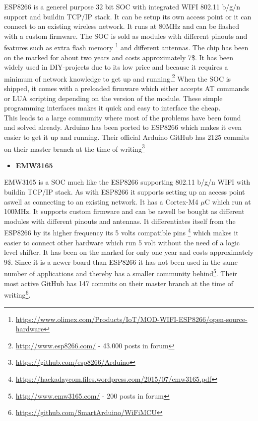 ESP8266 is a generel purpose 32 bit SOC with integrated WIFI 802.11 b/g/n support and buildin TCP/IP stack. It can be setup its own access point or it can connect to an existing wireless network.
It runs at 80MHz and can be flashed with a custom firmware. 
The SOC is sold as modules with different pinouts and features such as extra flash memory \footnote{\url{https://www.olimex.com/Products/IoT/MOD-WIFI-ESP8266/open-source-hardware}} and different antennas.
The chip has been on the marked for about two years and costs approximately 7\$. 
It has been widely used in DIY-projects due to its low price and because it requires a minimum of network knowledge to get up and running.\footnote{\url{http://www.esp8266.com/} - 43.000 posts in forum} When the SOC is shipped, it comes with a preloaded firmware which either accepts AT commands or LUA scripting depending on the version of the module. These simple programming interfaces makes it quick and easy to interface the cheap. \\
This leads to a large community where most of the problems have been found and solved already. Arduino has been ported to ESP8266 which makes it even easier to get it up and running. Their official Arduino GitHub has 2125 commits on their master branch at the time of writing\footnote{\url{https://github.com/esp8266/Arduino}} \\

\begin{itemize}
	\item \textbf{EMW3165}
\end{itemize}
EMW3165 is a SOC much like the ESP8266 supporting 802.11 b/g/n WIFI with buildin TCP/IP stack. As with ESP8266 it supports setting up an access point aswell as connecting to an existing network. It has a Cortex-M4 $\mu$C which run at 100MHz. 
It supports custom firmware and can be aswell be bought as different modules with different pinouts and antennas.
It differentiates itself from the ESP8266 by its higher frequency its 5 volts compatible pins \footnote{\url{https://hackadaycom.files.wordpress.com/2015/07/emw3165.pdf}} which makes it easier to connect other hardware which run 5 volt without the need of a logic level shifter. It has been on the marked for only one year and costs approximately 9\$. Since it is a newer board than ESP8266 it has not been used in the same number of applications and thereby has a smaller community behind\footnote{\url{http://www.emw3165.com/} - 200 posts in forum }. Their most active GitHub has 147 commits on their master branch at the time of writing\footnote{\url{https://github.com/SmartArduino/WiFiMCU}}.

